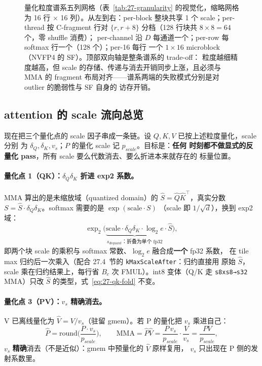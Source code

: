 \begin{figure}[H]
\begin{tikzpicture}
\end{tikzpicture}
\caption{量化粒度谱系五列网格（表~\ref{tab:27-granularity} 的视觉化，缩略网格为
16 行 $\times$ 16 列）。从左到右：per-block 整块共享 1 个 scale；per-thread 按
C-fragment 行对 $\{r,r+8\}$ 分档（128 行块共 $8\times8=64$ 个，零 shuffle 消费）；
per-channel 沿 $D$ 每通道一个；per-row 每 softmax 行一个（128 个）；per-16 每行
一个 $1\times16$ microblock（NVFP4 的 SF）。顶部双向轴是整条谱系的 trade-off：
粒度越细精度越高，但 scale 的存储、传递与消去开销同步上涨，且必须与 MMA 的
fragment 布局对齐——谱系两端的失败模式分别是对 outlier 的脆弱性与 SF 自身的
访存开销。}
\label{fig:27-granularity}
\end{figure}

\subsection{attention 的 scale 流向总览}

现在把三个量化点的 scale 因子串成一条链。设 $Q,K,V$ 已按上述粒度量化，scale 分别
为 $\delta_Q, \delta_K, v_s$；$P$ 的量化 scale 记 $p_{scale}$。目标是：\textbf{任何
时刻都不做显式的反量化 pass}，所有 scale 要么代数消去、要么折进本来就存在的
标量位置。

\paragraph{量化点 1（QK）：$\delta_Q\delta_K$ 折进 exp2 系数。}
MMA 算出的是未缩放域（quantized domain）的 $\hat{S} = \hat{Q}\hat{K}^{\top}$，真实分数
$S = \hat{S} \cdot \delta_Q\delta_K$。softmax 需要的是 $\exp(\text{scale} \cdot S)$
（scale 即 $1/\sqrt{d}$），换到 exp2 域：
\begin{equation}
  \exp_2\!\Big(
    \underbrace{\text{scale} \cdot \delta_Q\delta_K \cdot \log_2 e}_{s_{dequant}\text{：折叠为单个 fp32}}
    \cdot \hat{S}
  \Big),
  \label{eq:27-qk-fold}
\end{equation}
即两个块 scale 的乘积与 softmax 常数、$\log_2 e$ 融合成\textbf{一个} fp32 系数，
在 tile max 归约后一次乘入（配合 27.4~节的 \texttt{kMaxScaleAfter}：归约直接用
原始 $\hat{S}$，scale 乘在归约结果上，每行省 $B_c$ 次 FMUL）。int8 变体（Q/K 走
\texttt{s8xs8→s32} MMA）只改 $\hat{S}$ 的类型，式~\ref{eq:27-qk-fold} 不变。

\paragraph{量化点 3（PV）：$v_s$ 精确消去。}
V 已离线量化为 $\hat{V} = V / v_s$（驻留 gmem）。若 P 的量化把 $v_s$ 乘进自己：
\begin{equation}
  \hat{P} = \mathrm{round}\!\Big(\frac{P \cdot v_s}{p_{scale}}\Big),
  \qquad
  \mathrm{MMA} = \hat{P}\hat{V} = \frac{P\, v_s}{p_{scale}} \cdot \frac{V}{v_s}
  = \frac{PV}{p_{scale}},
  \label{eq:27-vs-cancel}
\end{equation}
$v_s$ \textbf{精确}消去（不是近似）：gmem 中预量化的 $\hat{V}$ 原样复用，
$v_s$ 只出现在 P 侧的发射系数里。

